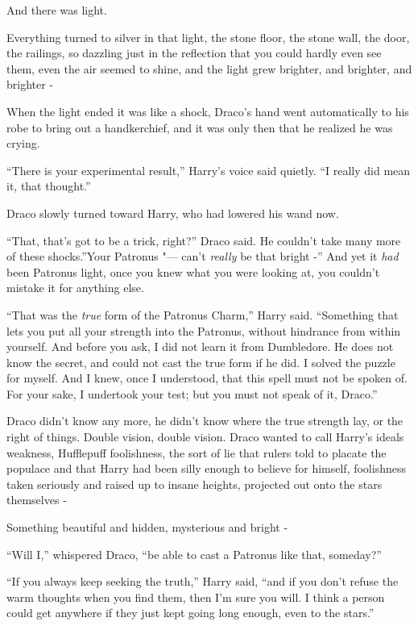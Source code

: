 And there was light.

Everything turned to silver in that light, the stone floor, the stone
wall, the door, the railings, so dazzling just in the reflection that
you could hardly even see them, even the air seemed to shine, and the
light grew brighter, and brighter, and brighter -

When the light ended it was like a shock, Draco's hand went
automatically to his robe to bring out a handkerchief, and it was only
then that he realized he was crying.

``There is your experimental result,'' Harry's voice said quietly. ``I
really did mean it, that thought.''

Draco slowly turned toward Harry, who had lowered his wand now.

``That, that's got to be a trick, right?'' Draco said. He couldn't take
many more of these shocks.''Your Patronus "--- can't \emph{really} be that
bright -'' And yet it \emph{had} been Patronus light, once you knew what
you were looking at, you couldn't mistake it for anything else.

``That was the \emph{true} form of the Patronus Charm,'' Harry said.
``Something that lets you put all your strength into the Patronus,
without hindrance from within yourself. And before you ask, I did not
learn it from Dumbledore. He does not know the secret, and could not
cast the true form if he did. I solved the puzzle for myself. And I
knew, once I understood, that this spell must not be spoken of. For your
sake, I undertook your test; but you must not speak of it, Draco.''

Draco didn't know any more, he didn't know where the true strength lay,
or the right of things. Double vision, double vision. Draco wanted to
call Harry's ideals weakness, Hufflepuff foolishness, the sort of lie
that rulers told to placate the populace and that Harry had been silly
enough to believe for himself, foolishness taken seriously and raised up
to insane heights, projected out onto the stars themselves -

Something beautiful and hidden, mysterious and bright -

``Will I,'' whispered Draco, ``be able to cast a Patronus like that,
someday?''

``If you always keep seeking the truth,'' Harry said, ``and if you don't
refuse the warm thoughts when you find them, then I'm sure you will. I
think a person could get anywhere if they just kept going long enough,
even to the stars.''

